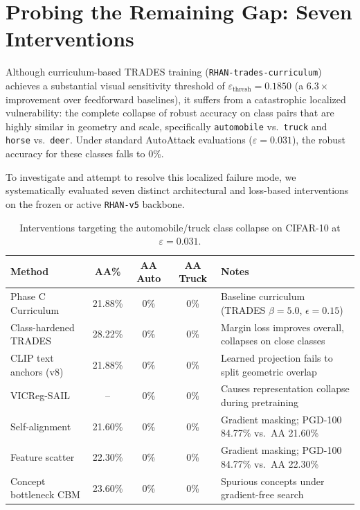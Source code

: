 \documentclass[12pt,a4paper]{article}
\begin{document}
\section{Probing the Remaining Gap: Seven Interventions}
\label{sec:seven_interventions}

Although curriculum-based TRADES training (\texttt{RHAN-trades-curriculum})
achieves a substantial visual sensitivity threshold of
$\varepsilon_{\text{thresh}} = 0.1850$ (a $6.3\times$ improvement over
feedforward baselines), it suffers from a catastrophic localized
vulnerability: the complete collapse of robust accuracy on class pairs
that are highly similar in geometry and scale, specifically
\texttt{automobile} vs.\ \texttt{truck} and \texttt{horse} vs.\
\texttt{deer}. Under standard AutoAttack evaluations
($\varepsilon = 0.031$), the robust accuracy for these classes falls to
0\%.

To investigate and attempt to resolve this localized failure mode, we
systematically evaluated seven distinct architectural and loss-based
interventions on the frozen or active \texttt{RHAN-v5} backbone.

\begin{table}[H]
\centering
\caption{Interventions targeting the automobile/truck class collapse on
CIFAR-10 at $\varepsilon=0.031$.}
\label{tab:auto_truck_interventions}
\renewcommand{\arraystretch}{1.25}
\begin{tabularx}{\textwidth}{lcccX}
\toprule
\textbf{Method} & \textbf{AA\%} & \textbf{AA Auto} & \textbf{AA Truck} & \textbf{Notes} \\
\midrule
Phase C Curriculum     & 21.88\% & 0\% & 0\% & Baseline curriculum (TRADES $\beta=5.0$, $\epsilon=0.15$) \\
Class-hardened TRADES  & 28.22\% & 0\% & 0\% & Margin loss improves overall, collapses on close classes \\
CLIP text anchors (v8) & 21.88\% & 0\% & 0\% & Learned projection fails to split geometric overlap \\
VICReg-SAIL            & --      & 0\% & 0\% & Causes representation collapse during pretraining \\
Self-alignment         & 21.60\% & 0\% & 0\% & Gradient masking; PGD-100 84.77\% vs.\ AA 21.60\% \\
Feature scatter        & 22.30\% & 0\% & 0\% & Gradient masking; PGD-100 84.77\% vs.\ AA 22.30\% \\
Concept bottleneck CBM & 23.60\% & 0\% & 0\% & Spurious concepts under gradient-free search \\
\bottomrule
\end{tabularx}
\end{table}
\end{document}
